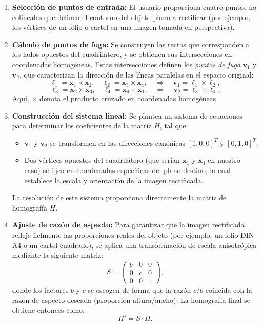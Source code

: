 \begin{enumerate}
    \item \textbf{Selección de puntos de entrada:} El usuario proporciona cuatro puntos no colineales que definen el contorno del objeto plano a rectificar (por ejemplo, los vértices de un folio o cartel en una imagen tomada en perspectiva).

    \item \textbf{Cálculo de puntos de fuga:} Se construyen las rectas que corresponden a los lados opuestos del cuadrilátero, y se obtienen sus intersecciones en coordenadas homogéneas. Estas intersecciones definen los \textit{puntos de fuga} \(\mathbf{v}_1\) y \(\mathbf{v}_2\), que caracterizan la dirección de las líneas paralelas en el espacio original:
    \[
    \ell_1 = \mathbf{x}_1 \times \mathbf{x}_2, \quad \ell_2 = \mathbf{x}_3 \times \mathbf{x}_4, \quad \Rightarrow \quad \mathbf{v}_1 = \ell_1 \times \ell_2,
    \]
    \[
    \ell_3 = \mathbf{x}_2 \times \mathbf{x}_3, \quad \ell_4 = \mathbf{x}_4 \times \mathbf{x}_1, \quad \Rightarrow \quad \mathbf{v}_2 = \ell_3 \times \ell_4.
    \]
    Aquí, \(\times\) denota el producto cruzado en coordenadas homogéneas.

    \item \textbf{Construcción del sistema lineal:} Se plantea un sistema de ecuaciones para determinar los coeficientes de la matriz \(H\), tal que:
    \begin{itemize}
        \item \(\mathbf{v}_1\) y \(\mathbf{v}_2\) se transformen en las direcciones canónicas \([1,0,0]^T\) y \([0,1,0]^T\).
        \item Dos vértices opuestos del cuadrilátero (que serían \(\mathbf{x}_1\) y \(\mathbf{x}_4\) en nuestro caso) se fijen en coordenadas específicas del plano destino, lo cual establece la escala y orientación de la imagen rectificada.
    \end{itemize}
    La resolución de este sistema proporciona directamente la matriz de homografía \(H\).

    \item \textbf{Ajuste de razón de aspecto:} Para garantizar que la imagen rectificada refleje fielmente las proporciones reales del objeto (por ejemplo, un folio DIN A4 o un cartel cuadrado), se aplica una transformación de escala anisotrópica mediante la siguiente matriz:
    \[
    S = 
    \begin{pmatrix}
    b & 0 & 0 \\
    0 & c & 0 \\
    0 & 0 & 1
    \end{pmatrix},
    \]
    donde los factores \(b\) y \(c\) se escogen de forma que la razón \(c/b\) coincida con la razón de aspecto deseada (proporción altura/ancho). La homografía final se obtiene entonces como:
    \[
    H' = S \cdot H.
    \]
\end{enumerate}

